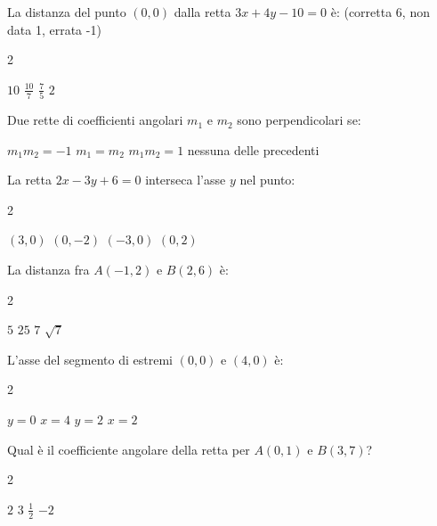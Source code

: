 \documentclass[a4paper,10pt]{exam}
\begin{document}
\vspace{2mm}
\begin{questions}
\question La distanza del punto $(0,0)$ dalla retta $3x+4y-10=0$ è: \hfill{\footnotesize (corretta 6, non data 1, errata -1)}
\vspace{0.2em}
\begin{multicols}{2}
\begin{choices}
\choice $10$
\choice $\frac{10}{7}$
\choice $\frac{7}{5}$
\choice $2$
\end{choices}
\end{multicols}

\question Due rette di coefficienti angolari $m_1$ e $m_2$ sono perpendicolari se:
\vspace{0.2em}
\begin{choices}
\choice $m_1m_2=-1$
\choice $m_1=m_2$
\choice $m_1m_2=1$
\choice nessuna delle precedenti
\end{choices}

\question La retta $2x-3y+6=0$ interseca l'asse $y$ nel punto:
\vspace{0.2em}
\begin{multicols}{2}
\begin{choices}
\choice $(3,0)$
\choice $(0,-2)$
\choice $(-3,0)$
\choice $(0,2)$
\end{choices}
\end{multicols}

\question La distanza fra $A(-1,2)$ e $B(2,6)$ è:
\vspace{0.2em}
\begin{multicols}{2}
\begin{choices}
\choice $5$
\choice $25$
\choice $7$
\choice $\sqrt{7}$
\end{choices}
\end{multicols}

\question L'asse del segmento di estremi $(0,0)$ e $(4,0)$ è:
\vspace{0.2em}
\begin{multicols}{2}
\begin{choices}
\choice $y=0$
\choice $x=4$
\choice $y=2$
\choice $x=2$
\end{choices}
\end{multicols}

\question Qual è il coefficiente angolare della retta per $A(0,1)$ e $B(3,7)$?
\vspace{0.2em}
\begin{multicols}{2}
\begin{choices}
\choice $2$
\choice $3$
\choice $\frac12$
\choice $-2$
\end{choices}
\end{multicols}


\end{questions}
\end{document}
